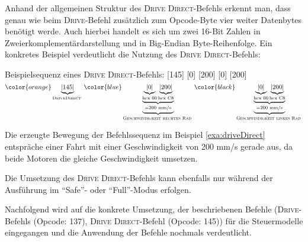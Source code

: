 Anhand der allgemeinen Struktur des \textsc{Drive} \textsc{Direct}-Befehls erkennt man, dass genau wie beim \textsc{Drive}-Befehl zusätzlich zum Opcode-Byte vier weiter Datenbytes benötigt werde. Auch hierbei handelt es sich um zwei 16-Bit Zahlen in Zweierkomplementärdarstellung und in Big-Endian Byte-Reihenfolge.
Ein konkretes Beispiel verdeutlicht die Nutzung des \textsc{Drive} \textsc{Direct}-Befehls:

\begin{beispiel}{Beispielsequenz eines \textsc{Drive} \textsc{Direct}-Befehls: [145] [0] [200] [0] [200]} \\
\centering
\(\color{orange}\underbrace{\text{|145|}}_{\substack{\text{\textsc{Drive}\textsc{Direct }}}}\color{blue}\underbrace{\underbrace{\underbrace{\text{|0|}}_{\substack{\text{hex 00}}} \underbrace{\text{|200|}}_{\substack{\text{hex C8}}}}_{\substack{= \text{200 mm/s}}}}_{\substack{\text{\textsc{Geschwindigkeit rechtes Rad }}}} \color{black}\underbrace{\underbrace{\underbrace{\text{|0|}}_{\substack{\text{hex 00}}} \underbrace{\text{|200|}}_{\substack{\text{hex C8}}}}_{\substack{= \text{200 mm/s}}}}_{\substack{\text{\textsc{Geschwindigkeit linkes Rad }}}}\)
\label{exa:driveDirect}
\end{beispiel}

Die erzeugte Bewegung der Befehlssequenz im Beispiel \ref{exa:driveDirect} entspräche einer Fahrt mit einer Geschwindigkeit von 200 mm/s gerade aus, da beide Motoren die gleiche Geschwindigkeit umsetzen.

Die Umsetzung des \textsc{Drive} \textsc{Direct}-Befehls kann ebenfalls nur während der Ausführung im \enquote{Safe}- oder \enquote{Full}-Modus erfolgen. 

Nachfolgend wird auf die konkrete Umsetzung, der beschriebenen Befehle (\textsc{Drive}-Befehls (Opcode: 137), \textsc{Drive} \textsc{Direct}-Befehl (Opcode: 145)) für die Steuermodelle eingegangen und die Anwendung der Befehle nochmals verdeutlicht.




